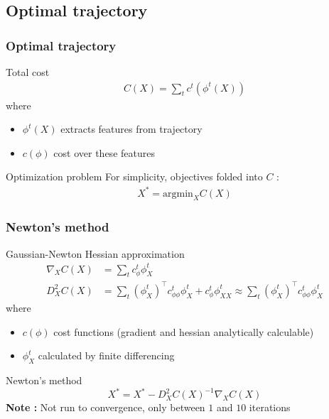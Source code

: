 \documentclass[mathserif]{beamer}
\begin{document}
\subsection{Optimal trajectory}

\begin{frame}
  \frametitle{{Optimal trajectory}}
  \begin{block}{Total cost}
  \begin{align*}
  C(X) = \sum\limits_{t}c^t(\phi^t(X))
  \end{align*}
  where
  \begin{itemize}
  \item $\phi^t(X)$ extracts features from trajectory
  \item $c(\phi)$ cost over these features
\end{itemize} 
  \end{block}
  
  
  \begin{block}{Optimization problem}
  For simplicity, objectives folded into $C$ : 
  \begin{align*}
  X^* = \text{argmin}_{X} C(X)
  \end{align*}
  \end{block}
  
\end{frame}



\begin{frame}
  \frametitle{{Newton's method}}
  \begin{block}{Gaussian-Newton Hessian approximation}
  \begin{align*}
  \nabla_{X}C(X) &= \sum\limits_{t}c_{\phi}^t\phi^t_{X} \\
  D^2_{X}C(X) &= \sum\limits_{t}(\phi^t_{X})^{\top}c_{\phi\phi}^t\phi^t_{X} + c_{\phi}^t\phi^{t}_{XX} \approx \sum\limits_{t}(\phi^t_{X})^{\top}c_{\phi\phi}^t\phi^t_{X}
  \end{align*}
  where
  \begin{itemize}
  \item $c(\phi)$ cost functions (gradient and hessian analytically calculable)
  \item $\phi_{X}^t$ calculated by finite differencing
\end{itemize} 
  \end{block}
  
   \begin{block}{Newton's method}
  \[
  X^{*} = X^{*} - D^2_{X}C(X)^{-1}\nabla_{X}C(X) 
  \]
  \textbf{Note :} Not run to convergence, only between $1$ and $10$ iterations
  \end{block}

\end{frame}
\end{document}
